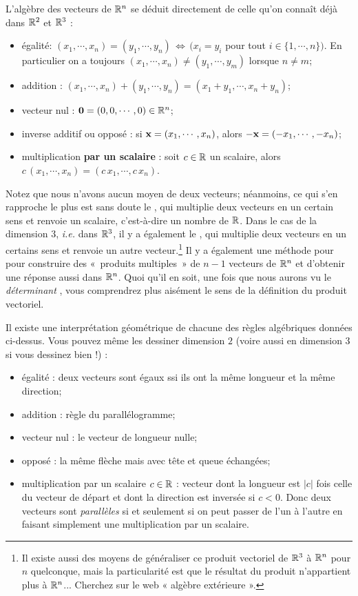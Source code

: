 L'algèbre des vecteurs de $\mathbb{R}^n$ se déduit directement de celle qu'on connaît déjà dans $\mathbb{R}^2$ et $\mathbb{R}^3$ : 
\begin{itemize}
\item égalité: $(x_1,\cdots, x_n) = (y_1,\cdots, y_n) \,\Longleftrightarrow\,  (x_i=y_i$ pour tout $i \in \{1,\cdots,n\})$.  En particulier on a toujours $(x_1,\cdots,x_n) \neq (y_1,\cdots, y_m)$ lorsque $n \neq m$;

\item addition : $(x_1,\cdots,x_n) + (y_1,\cdots, y_n) = (x_1+y_1, \cdots, x_n+y_n)$;
\item vecteur nul : $\mathbf{0} = (0,0,\cdots, 0) \in \mathbb{R}^n$;
\item inverse additif ou oppos\'e : si $\mathbf{x} = (x_1,\cdots,x_n)$, alors $-\mathbf{x} = (-x_1,\cdots,-x_n)$;
\item multiplication {\bf par un scalaire} : soit $c\in \mathbb{R}$ un scalaire, alors
$c\,(x_1,\cdots,x_n) = (c\,x_1,\cdots,c\,x_n)$.
\end{itemize}
Notez que nous n'avons aucun moyen de  deux vecteurs; néanmoins, ce qui s'en rapproche le plus est sans doute le , qui multiplie deux vecteurs en un certain sens et renvoie un scalaire, c'est-à-dire un nombre de $\mathbb{R}$. Dans le cas de la dimension $3$, \textit{i.e.} dans $\mathbb{R}^3$, il y a également le , qui multiplie deux vecteurs en un certains sens et renvoie un autre vecteur.\footnote{Il existe aussi des moyens de généraliser ce produit vectoriel de $\mathbb{R}^3$ à $\mathbb{R}^n$ pour $n$ quelconque, mais la particularité est que le résultat du produit n'appartient plus à  $\mathbb{R}^n$... Cherchez sur le web « algèbre extérieure ».}
 Il y a également une méthode pour pour construire des «~produits multiples~» de $n-1$  vecteurs de $\mathbb{R}^n$ et d'obtenir une réponse aussi dans $\mathbb{R}^n$. Quoi qu'il en soit, une fois que nous aurons vu le {\it déterminant }, vous comprendrez plus aisément le sens de la définition du produit vectoriel.

Il existe une interprétation géométrique de chacune des règles algébriques données ci-dessus. Vous pouvez même les dessiner dimension $2$ (voire aussi en dimension $3$ si vous dessinez bien !) :

\begin{itemize}
\item égalité : deux vecteurs sont égaux ssi ils ont la même longueur et la même direction;
\item addition : règle du parallélogramme;
\item vecteur nul : le vecteur de longueur nulle;
\item oppos\'e : la même flèche mais avec tête et queue échangées;
\item multiplication par un scalaire $c\in\mathbb{R}$ : vecteur dont la longueur est $\vert c \vert$ fois celle du vecteur de départ et dont la direction est inversée si $c<0$. Donc deux vecteurs sont \emph{parallèles} si et seulement si 
on peut passer de l'un à l'autre en faisant simplement une multiplication par un scalaire.
\end{itemize}

